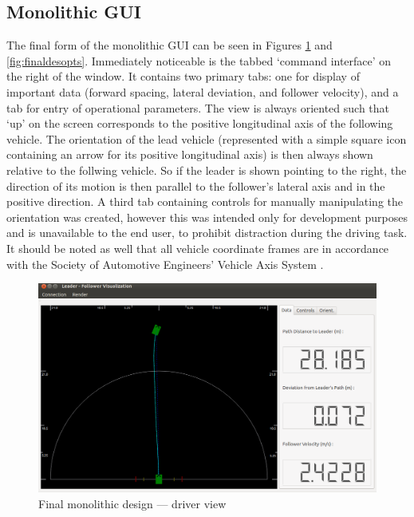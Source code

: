 \subsection{Monolithic GUI} \label{sec:finaldes_monolith}
The final form of the monolithic GUI can be seen in Figures \ref{fig:finaldesdriv_monolith} and \ref{fig:finaldesopts}. Immediately noticeable is the tabbed `command interface' on the right of the window. It contains two primary tabs: one for display of important data (forward spacing, lateral deviation, and follower velocity), and a tab for entry of operational parameters. The view is always oriented such that `up' on the screen corresponds to the positive longitudinal axis of the following vehicle. The orientation of the lead vehicle (represented with a simple square icon containing an arrow for its positive longitudinal axis) is then always shown relative to the follwing vehicle. So if the leader is shown pointing to the right, the direction of its motion is then parallel to the follower's lateral axis and in the positive direction. A third tab containing controls for manually manipulating the orientation was created, however this was intended only for development purposes and is unavailable to the end user, to prohibit distraction during the driving task. It should be noted as well that all vehicle coordinate frames are in accordance with the Society of Automotive Engineers' Vehicle Axis System \cite{vdbook}.

\begin{figure}[ht] \centering 
    \includegraphics[width=5in]{./figs/final_design_data.png}
    \caption{Final monolithic design --- driver view} \label{fig:finaldesdriv_monolith}
\end{figure}

